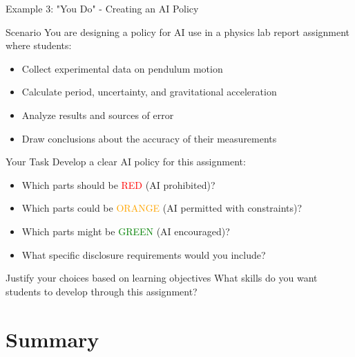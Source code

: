 \documentclass{beamer}
\begin{document}
\begin{frame}{Example 3: "You Do" - Creating an AI Policy}
\begin{block}{Scenario}
You are designing a policy for AI use in a physics lab report assignment where students:
\begin{itemize}
  \item Collect experimental data on pendulum motion
  \item Calculate period, uncertainty, and gravitational acceleration
  \item Analyze results and sources of error
  \item Draw conclusions about the accuracy of their measurements
\end{itemize}
\end{block}

\begin{block}{Your Task}
Develop a clear AI policy for this assignment:
\begin{itemize}
  \item Which parts should be
  \textcolor{red}{RED} (AI prohibited)?
  \item Which parts could be
  \textcolor{orange}{ORANGE} (AI permitted with constraints)?
  \item Which parts might be
  \textcolor{green}{GREEN} (AI encouraged)?
  \item What specific disclosure requirements would you include?
\end{itemize}
\end{block}

\begin{alertblock}{Justify your choices based on learning objectives}
What skills do you want students to develop through this assignment?
\end{alertblock}
\end{frame}

\section{Summary}
\end{document}
